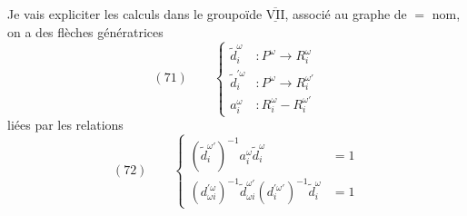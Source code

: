 Je vais expliciter les calculs dans le groupoïde $\overline{\underline{\mathrm{VII}}}$, associé au graphe de $=$ nom, on a des flèches génératrices
\[
(71)\qquad\left\{\begin{aligned}
\widetilde d_i^\omega&:P^\omega\longrightarrow R_i^\omega\\
\widetilde d_i^{\prime\omega}&:P^\omega\longrightarrow R_i^{\omega'}\\
a_i^\omega&:R_i^\omega\mathbin{-}R_i^{\omega'}
\end{aligned}\right.
\]
liées par les relations
\[
(72)\qquad\left\{\begin{aligned}
(\widetilde d_i^{\omega\prime})^{-1}a_i^\omega\widetilde d_i^\omega&=1\\
(d_{\omega i}^{\prime\omega})^{-1}\widetilde d_{\omega i}^{\omega'}(d_i^{\prime\omega'})^{-1}\widetilde d_i^\omega&=1
\end{aligned}\right.
\]
